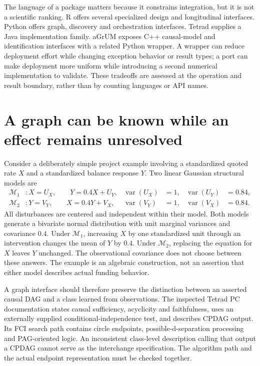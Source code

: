 The language of a package matters because it constrains integration, but it is
not a scientific ranking. R offers several specialized design and longitudinal
interfaces. Python offers graph, discovery and orchestration interfaces.
Tetrad supplies a Java implementation family. aGrUM exposes C++ causal-model
and identification interfaces with a related Python wrapper. A wrapper can
reduce deployment effort while changing exception behavior or result types;
a port can make deployment more uniform while introducing a second numerical
implementation to validate. These tradeoffs are assessed at the operation and
result boundary, rather than by counting languages or API names.

\section{A graph can be known while an effect remains unresolved}

Consider a deliberately simple project example involving a standardized quoted
rate \(X\) and a standardized balance response \(Y\). Two linear Gaussian
structural models are
\begin{align}
 \mathcal M_1 &: X=U_X,\qquad Y=0.4X+U_Y,
    &\operatorname{var}(U_X)&=1,&\operatorname{var}(U_Y)&=0.84,\\
 \mathcal M_2 &: Y=V_Y,\qquad X=0.4Y+V_X,
    &\operatorname{var}(V_Y)&=1,&\operatorname{var}(V_X)&=0.84.
\end{align}
All disturbances are centered and independent within their model. Both models
generate a bivariate normal distribution with unit marginal variances and
covariance \(0.4\). Under \(\mathcal M_1\), increasing \(X\) by one standardized
unit through an intervention changes the mean of \(Y\) by \(0.4\). Under
\(\mathcal M_2\), replacing the equation for \(X\) leaves \(Y\) unchanged. The
observational covariance does not choose between these answers. The example
is an algebraic construction, not an assertion that either model describes
actual funding behavior.

A graph interface should therefore preserve the distinction between an
asserted causal DAG and a class learned from observations. The inspected
Tetrad PC documentation states causal sufficiency, acyclicity and faithfulness,
uses an externally supplied conditional-independence test, and describes CPDAG
output. Its FCI search path contains circle endpoints, possible-d-separation
processing and PAG-oriented logic. An inconsistent class-level description
calling that output a CPDAG cannot serve as the interchange specification.
The algorithm path and the actual endpoint representation must be checked
together.\cite{v12_sw_tetrad}

